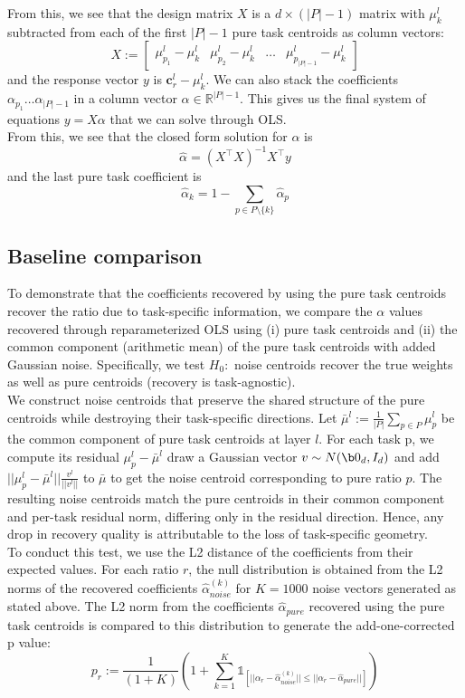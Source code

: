\documentclass[11pt]{article}
\begin{document}
From this, we see that the design matrix \(X\) is a \(d \times (|P| - 1)\) matrix with \(\mu_k^l\) subtracted from each of the first \(|P| - 1\) pure task centroids as column vectors:
$$
    X := \begin{bmatrix}\mu_{p_1}^l - \mu_k^l & \mu_{p_2}^l - \mu_k^l & \ldots & \mu_{p_{|P| - 1}}^l - \mu_k^l\end{bmatrix}
$$
and the response vector \(y\) is \(\textbf{c}_r^l - \mu_k^l\). We can also stack the coefficients \(\alpha_{p_1} \ldots \alpha_{|P| - 1}\) in a column vector \(\alpha \in \mathbb{R}^{|P| - 1}\). This gives us the final system of equations \(y = X \alpha\) that we can solve through OLS. \\[1em]
From this, we see that the closed form solution for \(\alpha\) is 
$$\hat\alpha = (X^\top X)^{-1} X^\top y$$
and the last pure task coefficient is 
$$\hat \alpha_k = 1 - \sum_{p \in P\setminus\{k\}} \hat\alpha_p$$

\subsection*{Baseline comparison}
To demonstrate that the coefficients recovered by using the pure task centroids recover the ratio due to task-specific information, we compare the \(\alpha\) values recovered through reparameterized OLS using (i) pure task centroids and (ii) the common component (arithmetic mean) of the pure task centroids with added Gaussian noise. Specifically, we test $H_0:$ noise centroids recover the true weights as well as pure centroids (recovery is task-agnostic). \\[1em]
We construct noise centroids that preserve the shared structure of the pure centroids while destroying their task-specific directions. Let \(\bar \mu^l := \frac{1}{|P|} \sum_{p \in P} \mu_p^l\) be the common component of pure task centroids at layer \(l\). For each task p, we compute its residual \(\mu^l_p - \bar \mu^l\) draw a Gaussian vector \(v \sim N(\b0_d, I_d)\) and add \(||\mu^l_p - \bar \mu^l|| \frac{v^l}{||v^l||}\) to \(\bar \mu\) to get the noise centroid corresponding to pure ratio \(p\). The resulting noise centroids match the pure centroids in their common component and per-task residual norm, differing only in the residual direction. Hence, any drop in recovery quality is attributable to the loss of task-specific geometry. \\[1em]
To conduct this test, we use the  L2 distance of the coefficients from their expected values. For each ratio \(r\), the null distribution is obtained from the L2 norms of the recovered coefficients \(\hat \alpha_{noise}^{(k)}\) for $K = 1000$ noise vectors generated as stated above. The L2 norm from the coefficients \(\hat \alpha_{pure}\) recovered using the pure task centroids is compared to this distribution to generate the add-one-corrected p value:
$$
    p_r := \frac{1}{(1 + K)} \left(1 + \sum_{k = 1}^K \mathds{1}_{\left[||\alpha_r - \hat \alpha_{noise}^{(k)}|| \leq ||\alpha_r - \hat \alpha_{pure}|| \right]} \right)
$$
\end{document}
